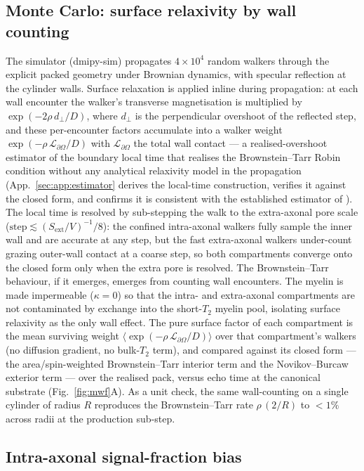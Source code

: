 \subsection{Monte Carlo: surface relaxivity by wall counting}
\label{sec:methods:mc}

The simulator (dmipy-sim) propagates $4\times10^{4}$ random walkers through the
explicit packed geometry under Brownian dynamics, with specular reflection at the
cylinder walls. Surface relaxation is applied inline during propagation: at each
wall encounter the walker's transverse magnetisation is multiplied by
$\exp(-2\rho\,d_\perp/D)$, where $d_\perp$ is the perpendicular overshoot of the
reflected step, and these per-encounter factors accumulate into a walker weight
$\exp(-\rho\,\mathcal L_{\partial\Omega}/D)$ with $\mathcal L_{\partial\Omega}$ the
total wall contact --- a realised-overshoot estimator of the boundary local time that
realises the Brownstein--Tarr Robin condition without any analytical relaxivity model in
the propagation (App.~\ref{sec:app:estimator} derives the local-time construction,
verifies it against the closed form, and confirms it is consistent with the established
estimator of \citealp{Cottaar2025}). The local time is resolved by sub-stepping the walk
to the extra-axonal pore scale ($\mathrm{step}\!\lesssim\!(S_{\mathrm{ext}}/V)^{-1}/8$):
the confined intra-axonal walkers fully sample the inner wall and are accurate at any step,
but the fast extra-axonal walkers under-count grazing outer-wall contact at a coarse step,
so both compartments converge onto the closed form only when the extra pore is resolved. The
Brownstein--Tarr behaviour, if it emerges, emerges from
counting wall encounters. The myelin is
made impermeable ($\kappa=0$) so that the intra- and extra-axonal compartments are
not contaminated by exchange into the short-$T_2$ myelin pool, isolating surface
relaxivity as the only wall effect. The pure surface factor of each compartment is
the mean surviving weight
$\langle\exp(-\rho\,\mathcal L_{\partial\Omega}/D)\rangle$ over that compartment's
walkers (no diffusion gradient, no bulk-$T_2$ term), and compared against its closed
form --- the area/spin-weighted Brownstein--Tarr interior term and the
Novikov--Burcaw exterior term --- over the realised pack, versus echo time at the
canonical substrate (Fig.~\ref{fig:mwf}A). As a unit check, the same wall-counting
on a single cylinder of radius $R$ reproduces the Brownstein--Tarr rate $\rho\,(2/R)$
to $<1\%$ across radii at the production sub-step.

\subsection{Intra-axonal signal-fraction bias}
\label{sec:methods:fintra}


